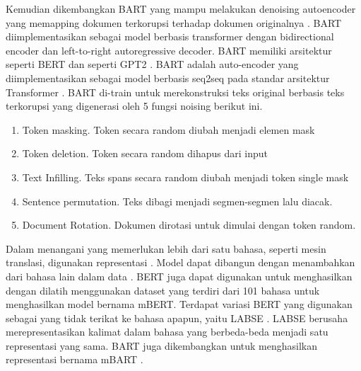 Kemudian dikembangkan \gls{BART} yang mampu melakukan denoising autoencoder yang memapping dokumen terkorupsi terhadap dokumen originalnya .
\gls{BART} diimplementasikan sebagai model berbasis transformer dengan bidirectional encoder dan left-to-right autoregressive decoder.
\gls{BART} memiliki arsitektur  seperti \gls{BERT}  dan  seperti \gls{GPT2} .
\gls{BART}  adalah auto-encoder yang diimplementasikan sebagai model berbasis \gls{seq2seq} pada standar arsitektur Transformer .
\gls{BART} di-train untuk merekonstruksi teks original berbasis teks terkorupsi yang digenerasi oleh 5 fungsi noising berikut ini.
\begin{enumerate}
  \item Token masking.
  Token secara random diubah menjadi elemen mask
  \item Token deletion.
  Token secara random dihapus dari input
  \item Text Infilling.
  Teks spans secara random diubah menjadi token single mask
  \item Sentence permutation.
  Teks dibagi menjadi segmen-segmen lalu diacak.
  \item Document Rotation.
  Dokumen dirotasi untuk dimulai dengan token random.
\end{enumerate}


Dalam menangani  yang memerlukan lebih dari satu bahasa, seperti mesin translasi, digunakan representasi \mwordem{}.
Model \multil{} dapat dibangun dengan menambahkan  dari bahasa lain dalam data .
\gls{BERT} juga dapat digunakan untuk menghasilkan \mwordem{} dengan dilatih menggunakan dataset yang terdiri dari 101 bahasa untuk menghasilkan \multil{} model bernama mBERT.
Terdapat variasi \gls{BERT} yang digunakan sebagai \mwordem{} yang tidak terikat ke bahasa apapun, yaitu \gls{LABSE} .
\gls{LABSE} berusaha merepresentasikan kalimat dalam bahasa yang berbeda-beda menjadi satu representasi yang sama.
\gls{BART} juga dikembangkan untuk menghasilkan representasi \mwordem{} bernama mBART .


